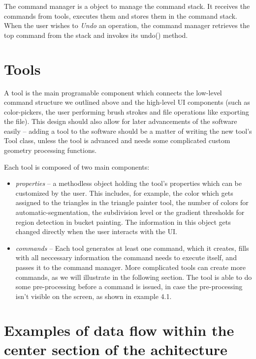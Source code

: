 The command manager is a object to manage the command stack. It receives the commands from tools, executes them and stores them in the command stack. When the user wishes to \textit{Undo} an operation, the command manager retrieves the top command from the stack and invokes its undo() method.

\section{Tools}

A tool is the main programable component which connects the low-level command structure we outlined above and the high-level UI components (such as color-pickers, the user performing brush strokes and file operations like exporting the file). This design should also allow for later advancements of the software easily -- adding a tool to the software should be a matter of writing the new tool's Tool class, unless the tool is advanced and needs some complicated custom geometry processing functions.

Each tool is composed of two main components:
\begin{itemize}
\item \textit{properties} -- a methodless object holding the tool's properties which can be customized by the user. This includes, for example, the color which gets assigned to the triangles in the triangle painter tool, the number of colors for automatic-segmentation, the subdivision level or the gradient thresholds for region detection in bucket painting. The information in this object gets changed directly when the user interacts with the UI.

\item \textit{commands} -- Each tool generates at least one command, which it creates, fills with all neccessary information the command needs to execute itself, and passes it to the command manager. More complicated tools can create more commands, as we will illustrate in the following section. The tool is able to do some pre-processing before a command is issued, in case the pre-processing isn't visible on the screen, as shown in example 4.1.

\end{itemize}

\section{Examples of data flow within the center section of the achitecture}

